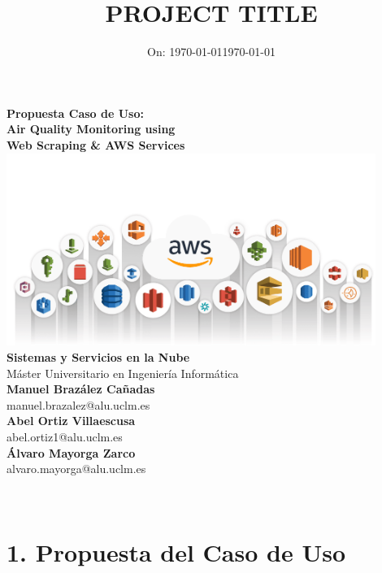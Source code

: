 \documentclass[12pt,a4paper]{report}
\title{\LARGE \textbf{PROJECT TITLE}}
\author{}
\date{\large On: \today}
\begin{document}
\makeatletter
\begin{titlepage}
    \centering
    \vspace*{1cm}
    
    {\LARGE \textbf{Propuesta Caso de Uso:}}\\[0.65cm]
    {\LARGE \textbf{Air Quality Monitoring using}}\\
    {\LARGE \textbf{ Web Scraping \& AWS Services}}\\[1cm]

    { \includegraphics[width=12cm]{img.png}}\\[1cm]
    
   \textbf{Sistemas y Servicios en la Nube}\\
    
    Máster Universitario en Ingeniería Informática\\[1.5cm]
    
    \textbf{Manuel Brazález Cañadas}\\
    manuel.brazalez@alu.uclm.es\\
    \textbf{Abel Ortiz Villaescusa}\\
    abel.ortiz1@alu.uclm.es\\
    \textbf{Álvaro Mayorga Zarco}\\
    alvaro.mayorga@alu.uclm.es\\[2cm]
    \date{\large \today}
    {\@date\\}
\end{titlepage}
\makeatother

\tableofcontents

\listoffigures

\newpage

\section*{1. Propuesta del Caso de Uso}
\end{document}
